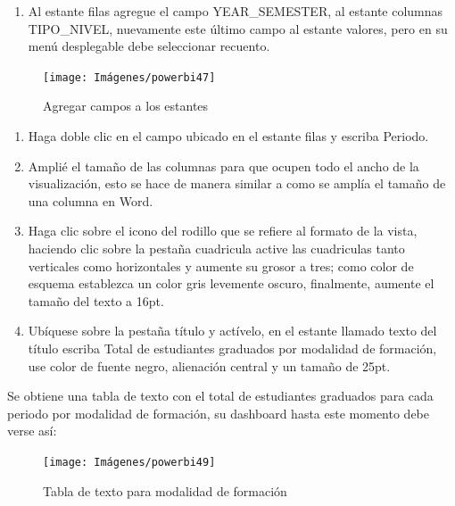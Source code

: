 \documentclass[
]{book}
\providecommand{\tightlist}{%
  \setlength{\itemsep}{0pt}\setlength{\parskip}{0pt}}
\begin{document}
\begin{enumerate}
\def\labelenumi{\arabic{enumi}.}
\setcounter{enumi}{1}
\tightlist
\item
  Al estante filas agregue el campo YEAR\_SEMESTER, al estante columnas TIPO\_NIVEL, nuevamente este último campo al estante valores, pero en su menú desplegable debe seleccionar recuento.
\end{enumerate}

\begin{figure}

{\centering \texttt{[image: Imágenes/powerbi47]} 

}

\caption{Agregar campos a los estantes}\label{fig:paso2matriz-fig}
\end{figure}

\begin{enumerate}
\def\labelenumi{\arabic{enumi}.}
\setcounter{enumi}{2}
\item
  Haga doble clic en el campo ubicado en el estante filas y escriba Periodo.
\item
  Amplié el tamaño de las columnas para que ocupen todo el ancho de la visualización, esto se hace de manera similar a como se amplía el tamaño de una columna en Word.
\item
  Haga clic sobre el icono del rodillo que se refiere al formato de la vista, haciendo clic sobre la pestaña cuadricula active las cuadriculas tanto verticales como horizontales y aumente su grosor a tres; como color de esquema establezca un color gris levemente oscuro, finalmente, aumente el tamaño del texto a 16pt.
\item
  Ubíquese sobre la pestaña título y actívelo, en el estante llamado texto del título escriba Total de estudiantes graduados por modalidad de formación, use color de fuente negro, alienación central y un tamaño de 25pt.
\end{enumerate}

Se obtiene una tabla de texto con el total de estudiantes graduados para cada periodo por modalidad de formación, su dashboard hasta este momento debe verse así:

\begin{figure}

{\centering \texttt{[image: Imágenes/powerbi49]} 

}

\caption{Tabla de texto para modalidad de formación}\label{fig:paso6matriz-fig}
\end{figure}
\end{document}
